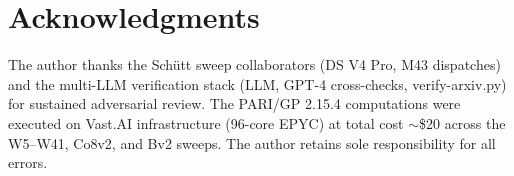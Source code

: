 \documentclass[11pt,a4paper]{amsart}
\theoremstyle{definition}
\begin{document}
\section*{Acknowledgments}

The author thanks the Sch\"utt sweep collaborators (DS V4 Pro, M43 dispatches) and the multi-LLM verification stack (LLM, GPT-4 cross-checks, verify-arxiv.py) for sustained adversarial review. The PARI/GP 2.15.4 computations were executed on Vast.AI infrastructure (96-core EPYC) at total cost $\sim$\$20 across the W5--W41, Co8v2, and Bv2 sweeps. The author retains sole responsibility for all errors.



\end{document}
